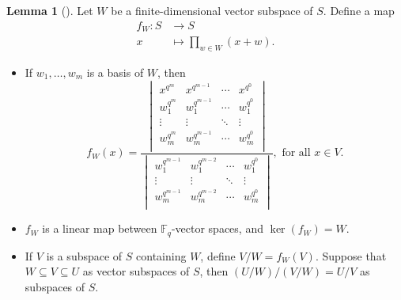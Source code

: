 \documentclass[12pt,a4paper]{report}
\theoremstyle{definition}
\newtheorem{lemma}[theorem]{Lemma}
\theoremstyle{remark}
\theoremstyle{definition}
\begin{document}
\begin{lemma}[{\cite[(7.6) and (7.16)]{macdonald_schur_1992}}]\label{lemma:f_W}
    Let $W$ be a finite-dimensional vector subspace of $S$. Define a map
    \begin{align*}
        f_W: S&\to S\\
        x&\mapsto \prod\limits_{w\in W}(x+w).
    \end{align*}
    \begin{itemize}
    \item[(1)] If $w_1, \ldots, w_m$ is a basis of $W$, then 
    \begin{equation*}
        f_W(x) = \dfrac{\begin{vmatrix}
        x^{q^m} & x^{q^{m-1}} & \cdots & x^{q^0}\\
        w_1^{q^m} & w_1^{q^{m-1}} & \cdots & w_1^{q^0}\\
        \vdots & \vdots & \ddots  & \vdots\\
        w_m^{q^m} & w_m^{q^{m-1}} & \cdots & w_m^{q^0}\\
        \end{vmatrix}}{\begin{vmatrix}
        w_1^{q^{m-1}} & w_1^{q^{m-2}} & \cdots & w_1^{q^0}\\
        \vdots & \vdots & \ddots  & \vdots\\
        w_m^{q^{m-1}} & w_m^{q^{m-2}} & \cdots & w_m^{q^0}\\
        \end{vmatrix}}, \text{ for all } x\in V.
    \end{equation*}
        \item[(2)] $f_W$ is a linear map between $\mathbb{F}_q$-vector spaces, and $\ker(f_W) = W$.
        \item[(3)] If $V$ is a subspace of $S$ containing $W$, define $V/W = f_W(V)$. Suppose that $W \subseteq V\subseteq U$ as vector subspaces of $S$, then $(U/W)/(V/W) = U/V$ as subspaces of $S$.
    \end{itemize}
\end{lemma}
\end{document}
